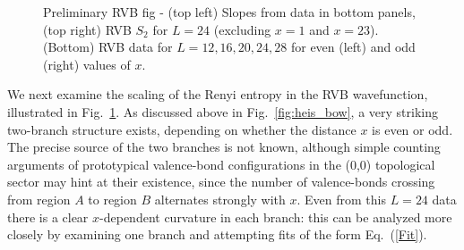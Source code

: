 \documentclass[prl,aps,twocolumn,floatfix,amsmath,amssymb,superscriptaddress,tightenlines]{revtex4}
\begin{document}

 \begin{figure}
   \begin{center}
   \end{center}
   \caption{Preliminary RVB fig - (top left) Slopes from data in bottom panels, (top right) RVB $S_2$ for $L=24$ (excluding $x=1$ and $x=23$). (Bottom) RVB data for $L=12,16,20,24,28$ for even (left) and odd (right) values of $x$.}
   \label{fig:2}
 \end{figure}

We next examine the scaling of the Renyi entropy in the RVB wavefunction, illustrated in Fig.~{\ref{fig:2}}.  
As discussed above in Fig.~\ref{fig:heis_bow}, a very striking two-branch structure exists, depending on whether the distance $x$ is even or odd.
The precise source of the two branches is not known, although simple counting arguments of prototypical valence-bond configurations in the (0,0) topological \cite{RVB1,RVB2} sector may hint at their existence, since the number of valence-bonds crossing from region $A$ to region $B$ alternates strongly with $x$.  Even from this $L=24$ data there is a clear $x$-dependent curvature in each branch: this can be analyzed more closely by examining one branch and attempting fits of the form Eq.~(\ref{Fit}).  
\end{document}
